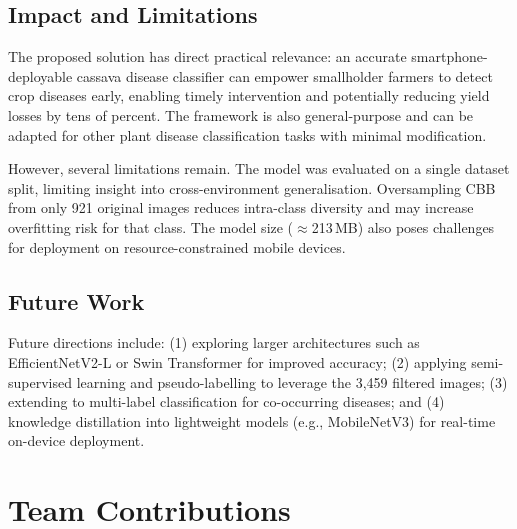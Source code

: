 \documentclass[12pt,a4paper]{article}
\begin{document}
\subsection{Impact and Limitations}

The proposed solution has direct practical relevance: an accurate smartphone-deployable cassava disease classifier can empower smallholder farmers to detect crop diseases early, enabling timely intervention and potentially reducing yield losses by tens of percent. The framework is also general-purpose and can be adapted for other plant disease classification tasks with minimal modification.

However, several limitations remain. The model was evaluated on a single dataset split, limiting insight into cross-environment generalisation. Oversampling CBB from only 921 original images reduces intra-class diversity and may increase overfitting risk for that class. The model size ($\approx$213\,MB) also poses challenges for deployment on resource-constrained mobile devices.

\subsection{Future Work}

Future directions include: (1) exploring larger architectures such as EfficientNetV2-L or Swin Transformer for improved accuracy; (2) applying semi-supervised learning and pseudo-labelling to leverage the 3,459 filtered images; (3) extending to multi-label classification for co-occurring diseases; and (4) knowledge distillation into lightweight models (e.g., MobileNetV3) for real-time on-device deployment.

\section{Team Contributions}
\end{document}
